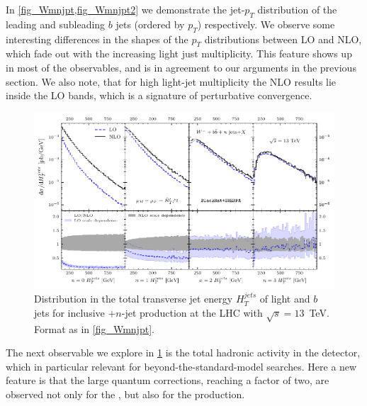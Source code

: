 In \cref{fig_Wmnjpt,fig_Wmnjpt2} we demonstrate the jet-$p_T$ distribution of the leading
and subleading $b$ jets (ordered by $p_T$) respectively. 
We observe some interesting differences in the shapes of the $p_T$ distributions between
LO and NLO, which fade out with the increasing light just multiplicity.
This feature shows up in most of the observables, and is in agreement to our arguments in the previous section.
We also note, that for high light-jet multiplicity  the NLO results lie inside the LO bands,
which is a signature of perturbative convergence.

\begin{figure}[ht]
  \centering
  \includegraphics[clip,scale=1.0]{plots/htjets.pdf}
  \caption{Distribution in the total transverse jet energy
    $H_T^{jets}$ of light  and $b$ jets for inclusive \Wbbm$+n$-jet
    production at the LHC with $\sqrt{s}=13$~TeV. Format as in \cref{fig_Wmnjpt}.}
    \label{fig_Wmnjht}
  \end{figure}

The next observable we explore in \cref{fig_Wmnjht} is the total hadronic activity in the detector,
which in particular relevant for beyond-the-standard-model searches.
Here a new feature is that the large quantum corrections, reaching a factor of two, are observed not only for the \Wbb{}, but also for the  \Wbbj{} production. 

